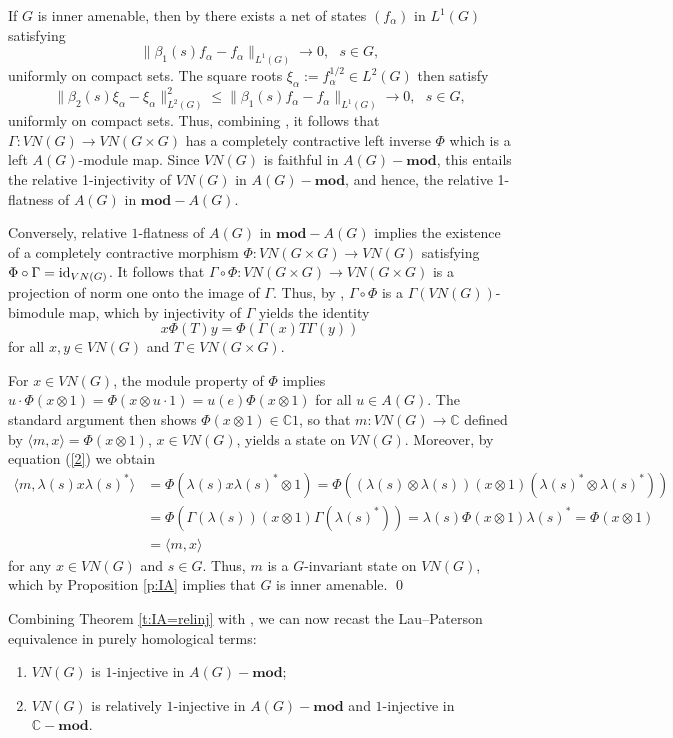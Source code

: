 \documentclass[preprint,12pt]{elsarticle}
\newcommand{\la}{\langle}
\newcommand{\ra}{\rangle}
\newcommand{\LG}{VN(G)}
\newcommand{\LO}{L^1(G)}
\newcommand{\LT}{L^2(G)}
\newcommand{\lm}{\lambda}
\newcommand{\Gam}{\Gamma}
\newcommand{\ten}{\otimes}
\newcommand{\id}{\textnormal{id}}
\providecommand{\norm}[1]{\lVert#1\rVert}
\newcommand{\C}{\mathbb{C}}
\begin{document}
\begin{pf} If $G$ is inner amenable, then by \cite[Proposition 1.13]{St2} there exists a net of states $(f_\alpha)$ in $\LO$ satisfying
$$\norm{\beta_1(s)f_\alpha-f_\alpha}_{\LO}\rightarrow0, \ \ \ s\in G,$$
uniformly on compact sets. The square roots $\xi_\alpha:=f_\alpha^{1/2}\in\LT$ then satisfy
$$\norm{\beta_2(s)\xi_\alpha - \xi_\alpha}^2_{\LT}\leq\norm{\beta_1(s)f_\alpha-f_\alpha}_{\LO}\rightarrow0, \ \ \ s\in G,$$
uniformly on compact sets. Thus, combining \cite[Lemma 3.1, Lemma 4.1]{RX}, it follows that $\Gam:\LG\rightarrow VN(G\times G)$ has a completely contractive left inverse $\Phi$ which is a left $A(G)$-module map. Since $\LG$ is faithful in $A(G)-\mathbf{mod}$, this entails the relative 1-injectivity of $\LG$ in $A(G)-\mathbf{mod}$, and hence, the relative 1-flatness of $A(G)$ in $\mathbf{mod}-A(G)$.

Conversely, relative $1$-flatness of $A(G)$ in $\mathbf{mod}-A(G)$ implies the existence of a completely contractive morphism $\Phi: VN(G\times G)\rightarrow \LG$ satisfying $\Phi\circ\Gam=\id_{\LG}$.
It follows that $\Gam\circ\Phi: VN(G\times G)\rightarrow  VN(G\times G)$ is a projection of norm one onto the image of $\Gam$. Thus, by \cite{To}, $\Gam\circ\Phi$ is a $\Gam(\LG)$-bimodule map, which by injectivity of $\Gam$ yields the identity
\begin{equation}\label{2} x\Phi(T)y=\Phi(\Gam(x)T\Gam(y))\end{equation}
for all $x,y\in\LG$ and $T\in VN(G\times G)$.

For $x\in VN(G)$, the module property of $\Phi$ implies $u\cdot\Phi(x\ten 1)=\Phi(x\ten u\cdot1)=u(e)\Phi(x\ten 1)$ for all $u\in A(G)$. The standard argument then shows $\Phi(x\ten1)\in\C1$, so that $m:\LG\rightarrow\C$ defined by $\la m,x\ra=\Phi(x\ten 1)$, $x\in \LG$, yields a state on $\LG$. Moreover, by equation (\ref{2}) we obtain
\begin{align*}\la m,\lm(s)x\lm(s)^*\ra&=\Phi(\lm(s)x\lm(s)^*\ten 1)=\Phi((\lm(s)\ten\lm(s))(x\ten 1)(\lm(s)^*\ten\lm(s)^*))\\
&=\Phi(\Gam(\lm(s))(x\ten 1)\Gam(\lm(s)^*))=\lm(s)\Phi(x\ten 1)\lm(s)^*=\Phi(x\ten 1)\\
&=\la m,x\ra\end{align*}
for any $x\in \LG$ and $s\in G$. Thus, $m$ is a $G$-invariant state on $\LG$, which by Proposition \ref{p:IA} implies that $G$ is inner amenable.
\qed\end{pf}

Combining Theorem \ref{t:IA=relinj} with \cite[Corollary 5.3]{C}, we can now recast the Lau--Paterson equivalence in purely homological terms:
\begin{enumerate}
\item $\LG$ is $1$-injective in $A(G)-\mathbf{mod}$;
\item $\LG$ is relatively $1$-injective in $A(G)-\mathbf{mod}$ and $1$-injective in $\C-\mathbf{mod}$.
\end{enumerate}
\end{document}
